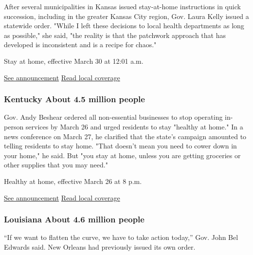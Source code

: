After several municipalities in Kansas issued stay-at-home instructions
in quick succession, including in the greater Kansas City region, Gov.
Laura Kelly issued a statewide order. "While I left these decisions to
local health departments as long as possible," she said, "the reality is
that the patchwork approach that has developed is inconsistent and is a
recipe for chaos."

Stay at home, effective March 30 at 12:01 a.m.

\href{https://governor.kansas.gov/governor-kelly-issues-temporary-statewide-stay-home-order-in-ongoing-effort-to-combat-covid-19/}{See
announcement} \textbar{}
\href{https://www.cjonline.com/news/20200328/kansas-coronavirus-update-gov-laura-kelly-imposes-statewide-stay-at-home-order-state-logs-5th-death-261-cases}{Read
local coverage}

\hypertarget{kentucky-about-45-million-people}{%
\subsubsection{Kentucky About 4.5 million
people}\label{kentucky-about-45-million-people}}

Gov. Andy Beshear ordered all non-essential businesses to stop operating
in-person services by March 26 and urged residents to stay "healthy at
home." In a news conference on March 27, he clarified that the state's
campaign amounted to telling residents to stay home. "That doesn't mean
you need to cower down in your home," he said. But "you stay at home,
unless you are getting groceries or other supplies that you may need."~

Healthy at home, effective March 26 at 8 p.m.

\href{https://kentucky.gov/Pages/Activity-stream.aspx?n=GovernorBeshear\&prId=105}{See
announcement} \textbar{}
\href{https://www.courier-journal.com/story/news/local/2020/03/23/coronavirus-kentucky-healthy-at-home-shelter-in-place-andy-beshear/2899060001/}{Read
local coverage}

\hypertarget{louisiana-about-46-million-people}{%
\subsubsection{Louisiana About 4.6 million
people}\label{louisiana-about-46-million-people}}

``If we want to flatten the curve, we have to take action today,'' Gov.
John Bel Edwards said. New Orleans had previously issued its own order.


